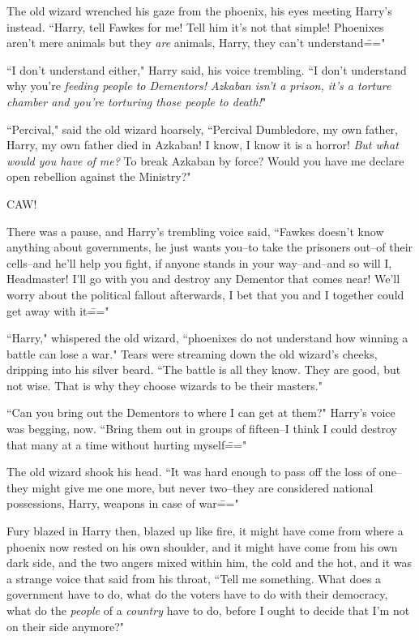 The old wizard wrenched his gaze from the phoenix, his eyes meeting Harry's instead. ``Harry, tell Fawkes for me! Tell him it's not that simple! Phoenixes aren't mere animals but they \emph{are} animals, Harry, they can't understand\==="

``I don't understand either," Harry said, his voice trembling. ``I don't understand why you're \emph{feeding people to Dementors! Azkaban isn't a prison, it's a torture chamber and you're torturing those people to \emph{death}!}"

``Percival," said the old wizard hoarsely, ``Percival Dumbledore, my own father, Harry, my own father died in Azkaban! I know, I know it is a horror! \emph{But what would you have of me?} To break Azkaban by force? Would you have me declare open rebellion against the Ministry?"

CAW!

There was a pause, and Harry's trembling voice said, ``Fawkes doesn't know anything about governments, he just wants you\---to take the prisoners out\---of their cells\---and he'll help you fight, if anyone stands in your way\---and\---and so will I, Headmaster! I'll go with you and destroy any Dementor that comes near! We'll worry about the political fallout afterwards, I bet that you and I together could get away with it\==="

``Harry," whispered the old wizard, ``phoenixes do not understand how winning a battle can lose a war." Tears were streaming down the old wizard's cheeks, dripping into his silver beard. ``The battle is all they know. They are good, but not wise. That is why they choose wizards to be their masters."

``Can you bring out the Dementors to where I can get at them?" Harry's voice was begging, now. ``Bring them out in groups of fifteen\---I think I could destroy that many at a time without hurting myself\==="

The old wizard shook his head. ``It was hard enough to pass off the loss of one\---they might give me one more, but never two\---they are considered national possessions, Harry, weapons in case of war\==="

Fury blazed in Harry then, blazed up like fire, it might have come from where a phoenix now rested on his own shoulder, and it might have come from his own dark side, and the two angers mixed within him, the cold and the hot, and it was a strange voice that said from his throat, ``Tell me something. What does a government have to do, what do the voters have to do with their democracy, what do the \emph{people} of a \emph{country} have to do, before I ought to decide that I'm not on their side anymore?"

